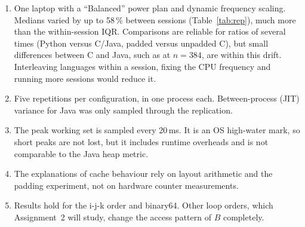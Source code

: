 \documentclass[11pt,a4paper]{article}
\newcommand{\concept}[1]{\par\addvspace{8pt}\Needspace{5\baselineskip}%
  \noindent{\color{accent}\bfseries\boldmath #1}\par\nopagebreak\vspace{2pt}}
\begin{document}
\concept{Limitations}
\begin{enumerate}[label=(\roman*), leftmargin=2.2em]
  \item One laptop with a ``Balanced'' power plan and dynamic frequency scaling. Medians varied by up
        to 58\,\% between sessions (Table~\ref{tab:rep}), much more than the within-session IQR.
        Comparisons are reliable for ratios of several times (Python versus C/Java, padded versus
        unpadded C), but small differences between C and Java, such as at $n=384$, are within this
        drift. Interleaving languages within a session, fixing the CPU frequency and running more
        sessions would reduce it.
  \item Five repetitions per configuration, in one process each. Between-process (JIT) variance for
        Java was only sampled through the replication.
  \item The peak working set is sampled every 20\,ms. It is an OS high-water mark, so short peaks are
        not lost, but it includes runtime overheads and is not comparable to the Java heap metric.
  \item The explanations of cache behaviour rely on layout arithmetic and the padding experiment, not
        on hardware counter measurements.
  \item Results hold for the i-j-k order and binary64. Other loop orders, which Assignment~2 will
        study, change the access pattern of $B$ completely.
\end{enumerate}

\end{document}
